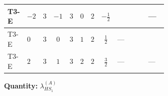 \documentclass[8pt]{article}
\begin{document}
\begin{landscape}
\begin{longtable}{@{}llcccccc >{\raggedright\arraybackslash}p{0.21\linewidth} >{\raggedright\arraybackslash}p{0.21\linewidth} >{\raggedright\arraybackslash}p{0.21\linewidth}@{}}
\midrule
T3-E & $-2$ & $3$ & $-1$ & $3$ & $0$ & $2$ & $-\frac{1}{2}$ & \scriptsize\adjustbox{max width=\linewidth}{$\begin{gathered} +{g_1}^2 \left(-4 {g_2}^2-\frac{15 {\lambda_{HS_1}^{(A)}}}{2}\right)\end{gathered}$} & \scriptsize\adjustbox{max width=\linewidth}{$\begin{gathered} -\frac{33 {g_2}^2 {\lambda_{HS_1}^{(A)}}}{2}\end{gathered}$} & --- \\
\midrule
T3-E & $0$ & $3$ & $0$ & $3$ & $1$ & $2$ & $\frac{1}{2}$ & --- & \scriptsize\adjustbox{max width=\linewidth}{$\begin{gathered} -\frac{33 {g_2}^2 {\lambda_{HS_1}^{(A)}}}{2}\end{gathered}$} & \scriptsize\adjustbox{max width=\linewidth}{$\begin{gathered} -\frac{3 {g_1}^2 {\lambda_{HS_1}^{(A)}}}{2}\end{gathered}$} \\
\midrule
T3-E & $2$ & $3$ & $1$ & $3$ & $2$ & $2$ & $\frac{3}{2}$ & --- & \scriptsize\adjustbox{max width=\linewidth}{$\begin{gathered} -\frac{33 {g_2}^2 {\lambda_{HS_1}^{(A)}}}{2}\end{gathered}$} & --- \\
\midrule
\bottomrule
\end{longtable}
\clearpage
\noindent\textbf{Quantity: }$\lambda_{HS_1}^{(A)}$\par\smallskip

\end{landscape}
\end{document}
